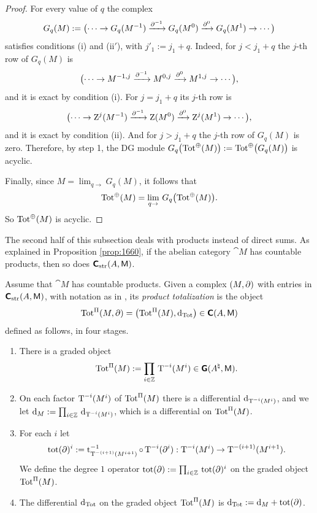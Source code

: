 \begin{proof}
For every value of $q$ the complex 
\[ G_q(M) := \bigl( \cdots \to G_q(M^{-1}) \xrightarrow{\partial^{-1}}
G_q(M^{0}) \xrightarrow{\partial^{0}} G_q(M^{1}) \to \cdots \bigr) \]
satisfies conditions (i) and (ii$'$), with 
$j'_1 := j_1 + q$. Indeed, for $j < j_1 + q$ the $j$-th row of $G_q(M)$ is 
\[ \bigl( \cdots \to M^{-1, j} \xrightarrow{\partial^{-1}}
M^{0, j} \xrightarrow{\partial^{0}} M^{1, j} \to \cdots \bigr) , \]
and it is exact by condition (i). 
For  $j = j_1 + q$ its $j$-th row is 
\[ \bigl( \cdots \to \operatorname{Z}^j(M^{-1}) \xrightarrow{\partial^{-1}}
\operatorname{Z}(M^{0}) \xrightarrow{\partial^{0}} \operatorname{Z}^j(M^{1}) \to \cdots \bigr) , \]
and it is exact by condition (ii). 
And for $j > j_1 + q$ the $j$-th row of $G_q(M)$ is zero. 
Therefore, by step 1, the DG module 
$G_q \bigl( \operatorname{Tot}^{\oplus}(M) \bigr) := 
\operatorname{Tot}^{\oplus} \bigl( G_q(M) \bigr)$ 
is acyclic. 

Finally, since $M = \lim_{q \to} G_q(M)$, 
it follows that 
\[ \operatorname{Tot}^{\oplus}(M) = 
\lim_{q \to} \, G_q \bigl( \operatorname{Tot}^{\oplus}(M) \bigr) . \]
So $\operatorname{Tot}^{\oplus}(M)$ is acyclic.
\end{proof}

The second half of this subsection deals with products instead of direct sums. 
As explained in Proposition \ref{prop:1660}, 
if the abelian category $\cat{M}$ has 
countable products, then so does $\boldsymbol{\mathsf{C}}_{\mathrm{str}}(A, \operatorname{\mathsf{M}})$. 

\begin{dfn} \label{dfn:3320}
Assume that $\cat{M}$ has countable products. Given a complex 
$(M, \partial)$ with entries in $\boldsymbol{\mathsf{C}}_{\mathrm{str}}(A, \operatorname{\mathsf{M}})$, with notation as 
in \tup{(\ref{eqn:3300})}, its 
{\em product totalization}%
is the object 
\[ \operatorname{Tot}^{\Pi}(M, \partial)  = 
\bigl( \operatorname{Tot}^{\Pi}(M), \mathrm{d}_{\mathrm{Tot}} \bigr) \in  
\boldsymbol{\mathsf{C}}(A, \operatorname{\mathsf{M}}) \]
defined as follows, in four stages. 
\begin{enumerate}
\item There is a graded object 
\[ \operatorname{Tot}^{\Pi}(M) := \prod_{i \in \mathbb{Z}} \, 
\operatorname{T}^{-i}(M^i) \in \boldsymbol{\mathsf{G}}(A^{\natural}, \operatorname{\mathsf{M}}) . \]

\item On each factor $\operatorname{T}^{-i}(M^i)$ of $\operatorname{Tot}^{\Pi}(M)$
there is a differential 
$\mathrm{d}_{\operatorname{T}^{-i}(M^i)}$, 
and we let 
$\mathrm{d}_M := \prod_{i \in \mathbb{Z}} \, \mathrm{d}_{\operatorname{T}^{-i}(M^i)}$,
which is a differential on $\operatorname{Tot}^{\Pi}(M)$. 

\item For each $i$ let 
\[ \operatorname{tot}(\partial)^i := \operatorname{t}^{-1}_{ \operatorname{T}^{-(i + 1)}(M^{i + 1})} \circ 
\operatorname{T}^{-i}(\partial^i) : 
\operatorname{T}^{-i}(M^i) \to \operatorname{T}^{-(i + 1)}(M^{i + 1}) . \]
We define the degree $1$ operator 
$\operatorname{tot}(\partial) := \prod_{i \in \mathbb{Z}} \, \operatorname{tot}(\partial)^i$
on the graded object $\operatorname{Tot}^{\Pi}(M)$.

\item The differential $\mathrm{d}_{\mathrm{Tot}}$ on the graded object 
$\operatorname{Tot}^{\Pi}(M)$ is 
$\mathrm{d}_{\mathrm{Tot}} := \mathrm{d}_M + \operatorname{tot}(\partial)$.
\end{enumerate}
\end{dfn}

